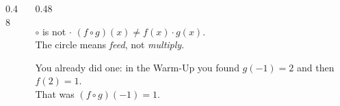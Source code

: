 \documentclass[aspectratio=169, 11pt]{beamer}
\begin{document}
\begin{frame}[t, plain]
\begin{columns}[T]
\begin{column}{0.48\textwidth}
\begin{itemize}
      \end{itemize}
    \end{column}
    \begin{column}{0.48\textwidth}
      \footnotesize
      \begin{block}{$\circ$ is not $\cdot$}
        $(f\circ g)(x)\ne f(x)\cdot g(x)$. \\[3pt]
        The circle means \emph{feed}, not \emph{multiply}.
      \end{block}
      \vspace{3pt}
      You already did one: in the Warm-Up you found $g(-1)=2$ and then $f(2)=1$. \\[3pt]
      That was $(f\circ g)(-1)=1$.
    \end{column}
  \end{columns}
\end{frame}
\end{document}
